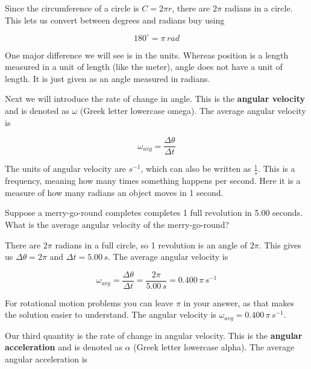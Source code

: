 \documentclass[12pt]{book}
\begin{document}
Since the circumference of a circle is $C = 2 \pi r$, there are $2 \pi$ radians in a circle. This lets us convert between degrees and radians buy using

\begin{equation}
180^{\circ} = \pi \, rad
\end{equation}

One major difference we will see is in the units. Whereas position is a length measured in a unit of length (like the meter), angle does not have a unit of length. It is just given as an angle measured in radians.

Next we will introduce the rate of change in angle. This is the \textbf{angular velocity} and is denoted as $\omega$ (Greek letter lowercase omega). The average angular velocity is

\begin{equation}
\omega_{avg} = \frac{\Delta \theta}{\Delta t}
\end{equation}

The units of angular velocity are $s^{-1}$, which can also be written as $\frac{1}{s}$. This is a frequency, meaning how many times something happens per second. Here it is a measure of how many radians an object moves in 1 second.

\pagebreak

\begin{exampleblock}

Suppose a merry-go-round completes completes 1 full revolution in 5.00 seconds. What is the average angular velocity of the merry-go-round?

\hspace{10pt}

There are $2 \pi$ radians in a full circle, so 1 revolution is an angle of $2 \pi$. This gives us $\Delta \theta = 2 \pi$ and $\Delta t = 5.00 \, s$. The average angular velocity is

\begin{equation}
\omega_{avg} = \frac{\Delta \theta}{\Delta t} = \frac{2 \pi}{5.00 \, s} = 0.400 \, \pi \, s^{-1}
\end{equation}

For rotational motion problems you can leave $\pi$ in your answer, as that makes the solution easier to understand. The angular velocity is $\omega_{avg} = 0.400 \, \pi \, s^{-1}$.

\end{exampleblock}

Our third quantity is the rate of change in angular velocity. This is the \textbf{angular acceleration} and is denoted as $\alpha$ (Greek letter lowercase alpha). The average angular acceleration is 
\end{document}

